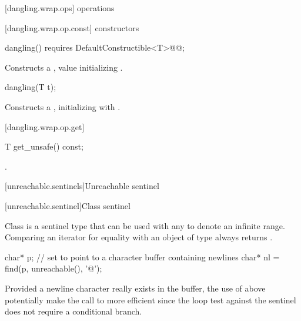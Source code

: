 \begin{addedblock}
{[dangling.wrap.ops]{ operations}

[dangling.wrap.op.const]{ constructors}

%
\begin{itemdecl}
dangling() requires DefaultConstructible<T>@\newtxt{()}@;
\end{itemdecl}

\begin{itemdescr}
\pnum
\effects Constructs a , value initializing .
\end{itemdescr}

%
\begin{itemdecl}
dangling(T t);
\end{itemdecl}

\begin{itemdescr}
\pnum
\effects Constructs a , initializing  with .
\end{itemdescr}

[dangling.wrap.op.get]{}

%
%
\begin{itemdecl}
T get_unsafe() const;
\end{itemdecl}

\begin{itemdescr}
\pnum
\returns {}.
\end{itemdescr}
}

[unreachable.sentinels]{Unreachable sentinel}

[unreachable.sentinel]{Class  sentinel}

\pnum
{}%
Class  is a sentinel type that can be used with any
 to denote an infinite range. Comparing an iterator for equality with
an object of type  always returns .

\enterexample
\begin{codeblock}
char* p;
// set  to point to a character buffer containing newlines
char* nl = find(p, unreachable(), '@\textbackslash@n');
\end{codeblock}

Provided a newline character really exists in the buffer, the use of 
above potentially make the call to  more efficient since the loop test against
the sentinel does not require a conditional branch.
\exitexample


\end{addedblock}
